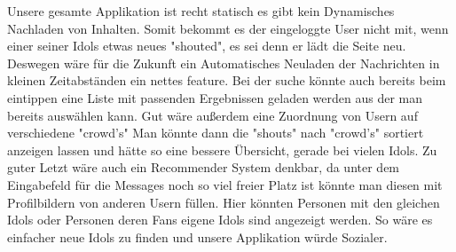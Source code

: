 \documentclass[12pt,a4paper]{article}
\begin{document}
Unsere gesamte Applikation ist recht statisch es gibt kein Dynamisches Nachladen von Inhalten. Somit bekommt es der eingeloggte User nicht mit, wenn einer seiner Idols etwas neues "shouted", es sei denn er lädt die Seite neu. Deswegen wäre für die Zukunft ein Automatisches Neuladen der Nachrichten in kleinen Zeitabständen ein nettes feature. Bei der suche könnte auch bereits beim eintippen eine Liste mit passenden Ergebnissen geladen werden aus der man bereits auswählen kann. 
Gut wäre außerdem eine Zuordnung von Usern auf verschiedene "crowd's" Man könnte dann die "shouts" nach "crowd's" sortiert anzeigen lassen und hätte so eine bessere Übersicht, gerade bei vielen Idols.
Zu guter Letzt wäre auch ein Recommender System denkbar, da unter dem Eingabefeld für die Messages noch so viel freier Platz ist könnte man diesen mit Profilbildern von anderen Usern füllen. Hier könnten Personen mit den gleichen Idols oder Personen deren Fans eigene Idols sind angezeigt werden. So wäre es einfacher neue Idols zu finden und unsere Applikation würde Sozialer.
\end{document}
